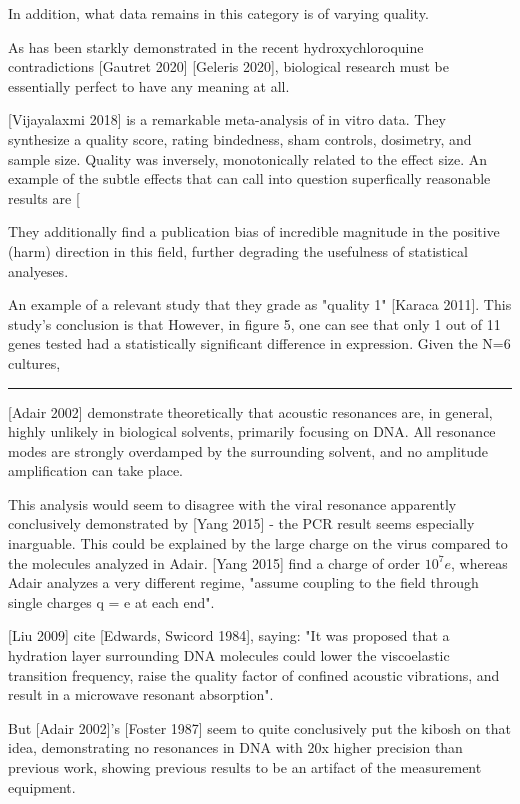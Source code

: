 \documentclass[fleqn,10pt]{article}
\begin{document}
\begin{multicols}{1}
In addition, what data remains in this category is of varying quality. 

As has been starkly demonstrated in the recent hydroxychloroquine contradictions [Gautret 2020] [Geleris 2020], biological research must be essentially perfect to have any meaning at all.

[Vijayalaxmi 2018] is a remarkable meta-analysis of in vitro data. They synthesize a quality score, rating bindedness, sham controls, dosimetry, and sample size. Quality was inversely, monotonically related to the effect size. An example of the subtle effects that can call into question superfically reasonable results are [

They additionally find a publication bias of incredible magnitude in the positive (harm) direction in this field, further degrading the usefulness of statistical analyeses.

An example of a relevant study that they grade as "quality 1" [Karaca 2011]. This study's conclusion is that However, in figure 5, one can see that only 1 out of 11 genes tested had a statistically significant difference in expression. Given the N=6 cultures, 

\rule{\linewidth}{0.2pt}

[Adair 2002] demonstrate theoretically that acoustic resonances are, in general, highly unlikely in biological solvents, primarily focusing on DNA. All resonance modes are strongly overdamped by the surrounding solvent, and no amplitude amplification can take place.

This analysis would seem to disagree with the viral resonance apparently conclusively demonstrated by [Yang 2015] - the PCR result seems especially inarguable. This could be explained by the large charge on the virus compared to the molecules analyzed in Adair. [Yang 2015] find a charge of order $10^7 e$, whereas Adair analyzes a very different regime, "assume coupling to the field through single charges q = e at each end".

[Liu 2009] cite [Edwards, Swicord 1984], saying: "It was proposed that a hydration layer surrounding DNA molecules could lower the viscoelastic transition
frequency, raise the quality factor of confined acoustic vibrations, and result in a microwave resonant absorption". 

But [Adair 2002]'s [Foster 1987] seem to quite conclusively put the kibosh on that idea, demonstrating no resonances in DNA with 20x higher precision than previous work, showing previous results to be an artifact of the measurement equipment.


\end{multicols}
\end{document}
